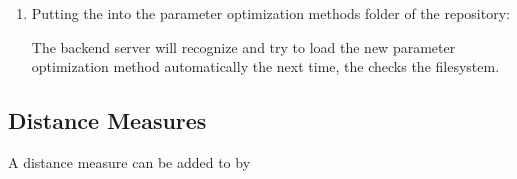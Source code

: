 \begin{enumerate}
			
			\item Putting the  into the parameter optimization methods folder of the repository:
			
			\highlight{\reposuppparamopts}
			
			The backend server will recognize and try to load the new parameter optimization method automatically the next time, the  checks the filesystem.
		\end{enumerate}
			
			
	\subsection{Distance Measures}\label{subsec_extend_distmeasures}
	A distance measure  can be added to \clusteval by
